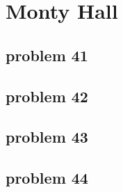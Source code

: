 \section{Monty Hall}

\subsection{problem 41}


\subsection{problem 42}


\subsection{problem 43}


\subsection{problem 44}
